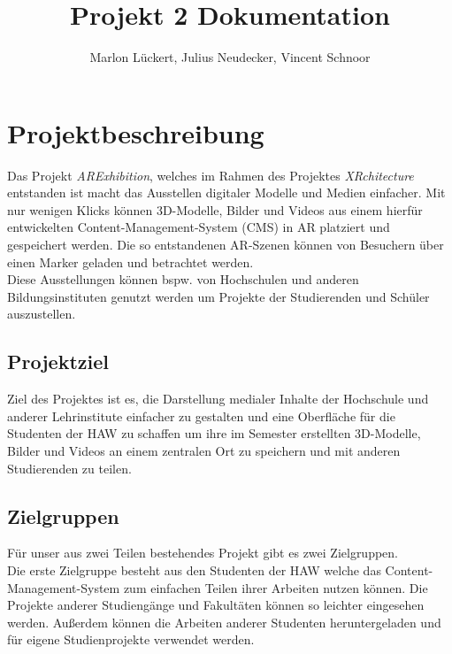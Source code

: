 \documentclass[12pt,a4paper]{article}
\author{Marlon Lückert, Julius Neudecker, Vincent Schnoor}
\title{
Projekt 2 Dokumentation
}
\begin{document}
%
%
%

\maketitle
\section{Projektbeschreibung}
Das Projekt \textit{ARExhibition}, welches im Rahmen des Projektes \textit{XRchitecture} entstanden ist macht das Ausstellen digitaler Modelle und Medien einfacher. Mit nur wenigen Klicks können 3D-Modelle, Bilder und Videos aus einem hierfür entwickelten Content-Management-System (CMS) in AR platziert und gespeichert werden. Die so entstandenen AR-Szenen können von Besuchern über einen Marker geladen und betrachtet werden.\\
Diese Ausstellungen können bspw. von Hochschulen und anderen Bildungsinstituten genutzt werden um Projekte der Studierenden und Schüler auszustellen.
\subsection{Projektziel}
Ziel des Projektes ist es, die Darstellung medialer Inhalte der Hochschule und anderer Lehrinstitute einfacher zu gestalten und eine Oberfläche für die Studenten der HAW zu schaffen um ihre im Semester erstellten 3D-Modelle, Bilder und Videos an einem zentralen Ort zu speichern und mit anderen Studierenden zu teilen.
\subsection{Zielgruppen}
Für unser aus zwei Teilen bestehendes Projekt gibt es zwei Zielgruppen.\\
Die erste Zielgruppe besteht aus den Studenten der HAW welche das Content-Management-System zum einfachen Teilen ihrer Arbeiten nutzen können. Die Projekte anderer Studiengänge und Fakultäten können so leichter eingesehen werden. Außerdem können die Arbeiten anderer Studenten heruntergeladen und für eigene Studienprojekte verwendet werden.\\
\end{document}
